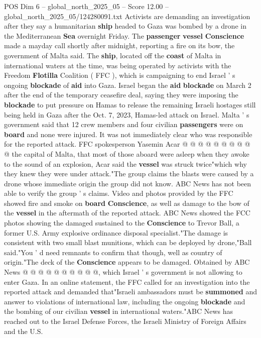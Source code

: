\begin{textsample}{POS Dim 6 – global\_north\_2025\_05 – Score 12.00 – global\_north\_2025\_05/124280091.txt}  \label{ex:f6_pos_064}
Activists are demanding an investigation after they say a humanitarian \textbf{ship} headed to Gaza was bombed by a drone in the Mediterranean \textbf{Sea} overnight Friday.
The \textbf{passenger} \textbf{vessel} \textbf{Conscience} made a mayday call shortly after midnight, reporting a fire on its bow, the government of Malta said.
The \textbf{ship}, located off the \textbf{coast} of Malta in international waters at the time, was being operated by activists with the Freedom \textbf{Flotilla} Coalition ( FFC ), which is campaigning to end Israel ' s ongoing \textbf{blockade} of \textbf{aid} into Gaza.
Israel began the \textbf{aid} \textbf{blockade} on March 2 after the end of the temporary ceasefire deal, saying they were imposing the \textbf{blockade} to put pressure on Hamas to release the remaining Israeli hostages still being held in Gaza after the Oct. 7, 2023, Hamas-led attack on Israel.
Malta ' s government said that 12 crew members and four civilian \textbf{passengers} were on \textbf{board} and none were injured.
It was not immediately clear who was responsible for the reported attack.
FFC spokesperson Yasemin Acar @ @ @ @ @ @ @ @ @ @ the capital of Malta, that most of those aboard were asleep when they awoke to the sound of an explosion, Acar said the \textbf{vessel} was struck twice"which why they knew they were under attack."The group claims the blasts were caused by a drone whose immediate origin the group did not know.
ABC News has not been able to verify the group ' s claims.
Video and photos provided by the FFC showed fire and smoke on \textbf{board} \textbf{Conscience}, as well as damage to the bow of the \textbf{vessel} in the aftermath of the reported attack.
ABC News showed the FCC photos showing the damaged sustained to the \textbf{Conscience} to Trevor Ball, a former U.S.
Army explosive ordinance disposal specialist."The damage is consistent with two small blast munitions, which can be deployed by drone,"Ball said."You ' d need remnants to confirm that though, well as country of origin."The deck of the \textbf{Conscience} appears to be damaged.
Obtained by ABC News @ @ @ @ @ @ @ @ @ @, which Israel ' s government is not allowing to enter Gaza.
In an online statement, the FFC called for an investigation into the reported attack and demanded that"Israeli ambassadors must be \textbf{summoned} and answer to violations of international law, including the ongoing \textbf{blockade} and the bombing of our civilian \textbf{vessel} in international waters."ABC News has reached out to the Israel Defense Forces, the Israeli Ministry of Foreign Affairs and the U.S.

\end{textsample}
